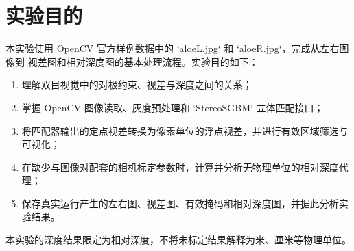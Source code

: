 \section{实验目的}

本实验使用 OpenCV 官方样例数据中的 `aloeL.jpg` 和 `aloeR.jpg`，完成从左右图像到
视差图和相对深度图的基本处理流程。实验目的如下：

\begin{enumerate}
  \item 理解双目视觉中的对极约束、视差与深度之间的关系；
  \item 掌握 OpenCV 图像读取、灰度预处理和 `StereoSGBM` 立体匹配接口；
  \item 将匹配器输出的定点视差转换为像素单位的浮点视差，并进行有效区域筛选与可视化；
  \item 在缺少与图像对配套的相机标定参数时，计算并分析无物理单位的相对深度代理；
  \item 保存真实运行产生的左右图、视差图、有效掩码和相对深度图，并据此分析实验结果。
\end{enumerate}

本实验的深度结果限定为相对深度，不将未标定结果解释为米、厘米等物理单位。
